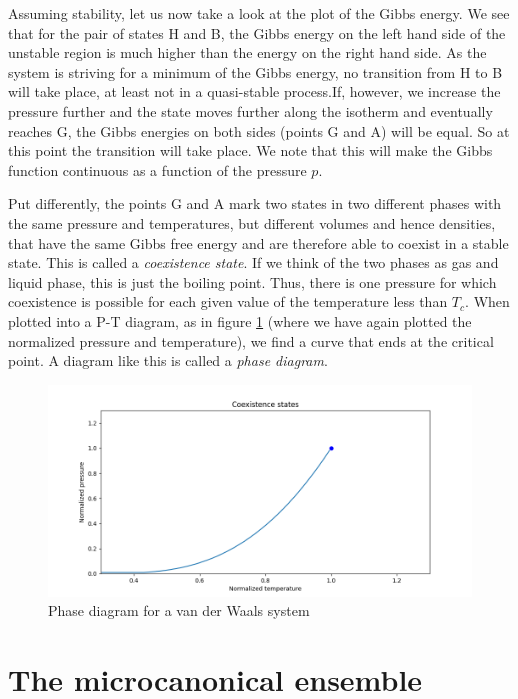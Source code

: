 \documentclass[a4paper, draft]{article}
\theoremstyle{own}
\theoremstyle{remark}
\begin{document}
Assuming stability, let us now take a look at the plot of the Gibbs energy. We see that for the pair of states H and B, the Gibbs energy on the left hand side of the unstable region is much higher than the energy on the right hand side. As the system is striving for a minimum of the Gibbs energy, no transition from H to B will take place, at least not in a quasi-stable process.If, however, we increase the pressure further and the state moves further along the isotherm and eventually reaches G, the Gibbs energies on both sides (points G and A) will be equal. So at this point the transition will take place. We note that this will make the Gibbs function continuous as a function of the pressure $p$. 

Put differently, the points G and A mark two states in two different phases with the same pressure and temperatures, but different volumes and hence densities, that have the same Gibbs free energy and are therefore able to coexist in a stable state. This is called a {\em coexistence state}. If we think of the two phases as gas and liquid phase, this is just the boiling point. Thus, there is one pressure for which coexistence is possible for each given value of the temperature less than $T_c$. When plotted into a P-T diagram, as in figure \ref{fig:VanDerWaalsPhaseDiagram} (where we have again plotted the normalized pressure and temperature), we find a curve that ends at the critical point. A diagram like this is called a {\em phase diagram}.

\begin{figure}[ht]
\centering
\includegraphics[scale=0.5]{VanDerWaalsPhaseDiagram}
\caption{Phase diagram for a van der Waals system}
\label{fig:VanDerWaalsPhaseDiagram}
\end{figure}
 


\section{The microcanonical ensemble}
\end{document}
